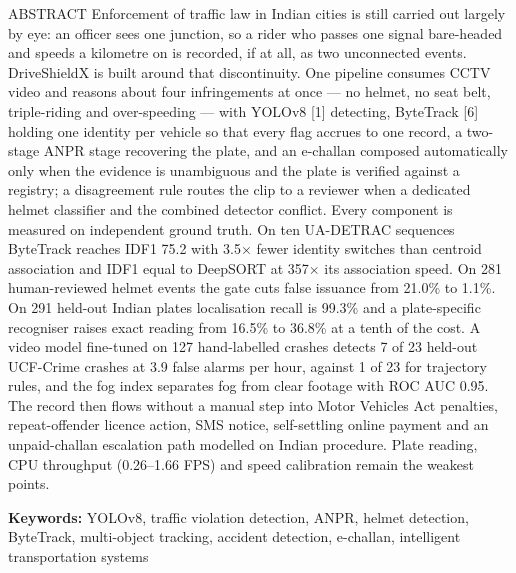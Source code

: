 \documentclass[aspectratio=169,10pt,t]{beamer}
\begin{document}
\begin{frame}{ABSTRACT}
\footnotesize
\setlength{\parskip}{0.35em}
Enforcement of traffic law in Indian cities is still carried out largely by eye: an officer sees one
junction, so a rider who passes one signal bare-headed and speeds a kilometre on is recorded, if at all, as two
unconnected events. DriveShieldX is built around that discontinuity. One pipeline consumes CCTV video and reasons about
four infringements at once --- no helmet, no seat belt, triple-riding and over-speeding --- with YOLOv8 [1] detecting,
ByteTrack [6] holding one identity per vehicle so that every flag accrues to one record, a two-stage ANPR stage
recovering the plate, and an e-challan composed automatically only when the evidence is unambiguous and the plate is
verified against a registry; a disagreement rule routes the clip to a reviewer when a dedicated helmet classifier and
the combined detector conflict. Every component is measured on independent ground truth. On ten UA-DETRAC sequences
ByteTrack reaches IDF1 75.2 with 3.5$\times$ fewer identity switches than centroid association and IDF1 equal to
DeepSORT at 357$\times$ its association speed. On 281 human-reviewed helmet events the gate cuts false issuance from
21.0\% to 1.1\%. On 291 held-out Indian plates localisation recall is 99.3\% and a plate-specific recogniser raises
exact reading from 16.5\% to 36.8\% at a tenth of the cost. A video model fine-tuned on 127 hand-labelled crashes
detects 7 of 23 held-out UCF-Crime crashes at 3.9 false alarms per hour, against 1 of 23 for trajectory rules, and the
fog index separates fog from clear footage with ROC AUC 0.95. The record then flows without a manual step into Motor
Vehicles Act penalties, repeat-offender licence action, SMS notice, self-settling online payment and an unpaid-challan
escalation path modelled on Indian procedure. Plate reading, CPU throughput (0.26--1.66 FPS) and speed calibration
remain the weakest points.

\textbf{Keywords:} YOLOv8, traffic violation detection, ANPR, helmet detection, ByteTrack, multi-object
tracking, accident detection, e-challan, intelligent transportation systems
\end{frame}
\end{document}
